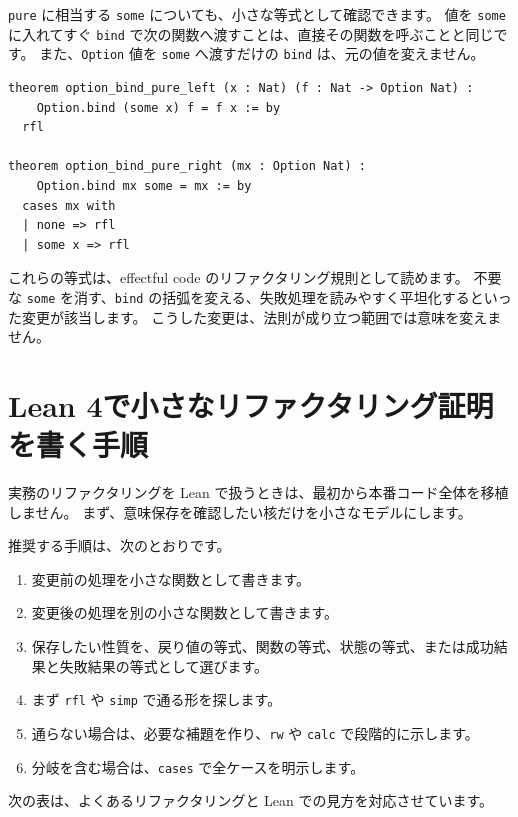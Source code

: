 \texttt{pure} に相当する \texttt{some} についても、小さな等式として確認できます。
値を \texttt{some} に入れてすぐ \texttt{bind} で次の関数へ渡すことは、直接その関数を呼ぶことと同じです。
また、\texttt{Option} 値を \texttt{some} へ渡すだけの \texttt{bind} は、元の値を変えません。

\begin{listing}[htbp]
\begin{verbatim}
theorem option_bind_pure_left (x : Nat) (f : Nat -> Option Nat) :
    Option.bind (some x) f = f x := by
  rfl

theorem option_bind_pure_right (mx : Option Nat) :
    Option.bind mx some = mx := by
  cases mx with
  | none => rfl
  | some x => rfl
\end{verbatim}
\caption{\texttt{option\_bind\_pure\_left}・\texttt{option\_bind\_pure\_right}}
\label{lst:ch34-option-pure-laws}
\end{listing}

これらの等式は、effectful code のリファクタリング規則として読めます。
不要な \texttt{some} を消す、\texttt{bind} の括弧を変える、失敗処理を読みやすく平坦化するといった変更が該当します。
こうした変更は、法則が成り立つ範囲では意味を変えません。

\section{Lean 4で小さなリファクタリング証明を書く手順}

実務のリファクタリングを Lean で扱うときは、最初から本番コード全体を移植しません。
まず、意味保存を確認したい核だけを小さなモデルにします。

推奨する手順は、次のとおりです。
\begin{enumerate}
\item 変更前の処理を小さな関数として書きます。
\item 変更後の処理を別の小さな関数として書きます。
\item 保存したい性質を、戻り値の等式、関数の等式、状態の等式、または成功結果と失敗結果の等式として選びます。
\item まず \texttt{rfl} や \texttt{simp} で通る形を探します。
\item 通らない場合は、必要な補題を作り、\texttt{rw} や \texttt{calc} で段階的に示します。
\item 分岐を含む場合は、\texttt{cases} で全ケースを明示します。
\end{enumerate}

次の表は、よくあるリファクタリングと Lean での見方を対応させています。

